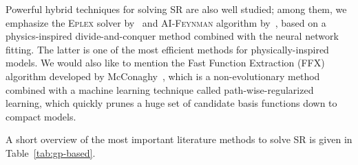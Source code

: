 \documentclass{bmcart}
\begin{document}
Powerful hybrid techniques for solving SR are also well studied; among them, we emphasize the \textsc{Eplex} solver by~\cite{la2019probabilistic,la2016epsilon} and \textsc{AI-Feynman} algorithm by~\cite{udrescu2020ai}, based on a physics-inspired divide-and-conquer method combined with the neural network fitting. The latter is one of the most efficient methods for physically-inspired models. We would also like to mention the Fast Function Extraction (\textsc{FFX}) algorithm developed by McConaghy~\cite{mcconaghy2011ffx}, which is a non-evolutionary method combined with a machine learning technique called path-wise-regularized learning, which quickly prunes a huge set of candidate basis functions down to compact models.

A short overview of the most important literature methods to solve SR is given in Table~\ref{tab:gp-based}.  
\end{document}
